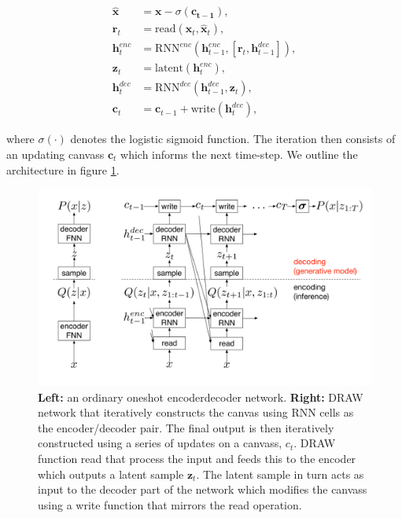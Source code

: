 \begin{align}
\hat{\mathbf{x}} &= \mathbf{x} - \sigma(\mathbf{c_{t-1}}), \\
\mathbf{r}_t &= \text{read}(\mathbf{x}_t, \hat{\mathbf{x}}_t ), \\
\mathbf{h}^{enc}_t &= \text{RNN}^{enc}( \mathbf{h}^{enc}_{t-1}, [\mathbf{r}_t, \mathbf{h}^{dec}_{t-1}]),\\
\mathbf{z}_t &= \text{latent}(\mathbf{h}^{enc}_t),\\
\mathbf{h}^{dec}_t &= \text{RNN}^{dec}( \mathbf{h}^{dec}_{t-1}, \mathbf{z}_t),\\
\mathbf{c}_t &= \mathbf{c}_{t-1} + \text{write}(\mathbf{h}_t^{dec}) \label{eq:draw},
\end{align} 

 \noindent where $\sigma(\cdot)$ denotes the logistic sigmoid function. The iteration then consists of an updating canvass $\mathbf{c}_t$ which informs the next time-step. We outline the architecture in figure \ref{fig:draw}.

\begin{figure}[h]
\centering
\includegraphics[width=\textwidth]{../figures/draw}
\caption[DRAW network architecture]{\textbf{Left:} an ordinary one\-shot encoder\-decoder network. \textbf{Right:} DRAW network that iteratively constructs the canvas using RNN cells as the encoder/decoder pair. The final output is then iteratively constructed using a series of updates on a canvass, $c_t$. DRAW function read that process the input and feeds this to the encoder which outputs a latent sample $\mathbf{z}_t$. The latent sample in turn acts as input to the decoder part of the network which modifies the canvass using a write function that mirrors the read operation.}\label{fig:draw}
\end{figure}
 
